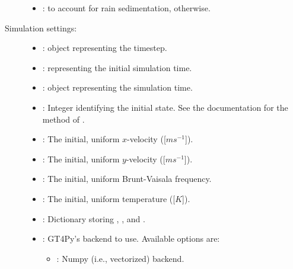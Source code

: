 \documentclass[letterpaper,10pt,english]{sphinxmanual}
\begin{document}
\begin{description}
\begin{itemize}
\item {} 
:  to account for rain sedimentation,  otherwise.

\end{itemize}

\item[{Simulation settings:}] \leavevmode\begin{itemize}
\item {} 
:  object representing the timestep.

\item {} 
:  representing the initial simulation time.

\item {} 
:  object representing the simulation time.

\item {} 
: Integer identifying the initial state. See the documentation for the method               of               .

\item {} 
: The initial, uniform \(x\)-velocity ({[}\(m s^{-1}\){]}).

\item {} 
: The initial, uniform \(y\)-velocity ({[}\(m s^{-1}\){]}).

\item {} 
: The initial, uniform Brunt-Vaisala frequency.

\item {} 
: The initial, uniform temperature ({[}\(K\){]}).

\item {} 
: Dictionary storing ,               ,  and .

\item {} 
: GT4Py’s backend to use. Available options are:
\begin{itemize}
\item {} 
: Numpy (i.e., vectorized) backend.


\end{itemize}
\end{itemize}
\end{description}
\end{document}
